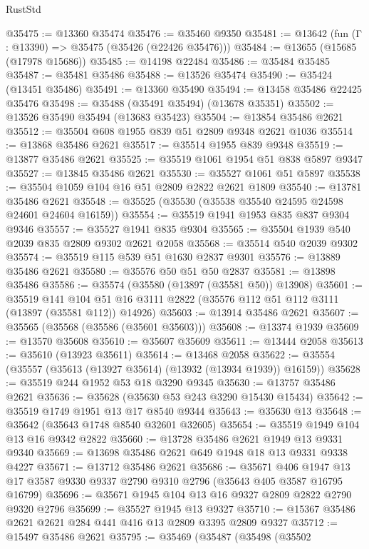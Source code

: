 \begin{lexlean}{RustStd}
\begin{coremodule}
@35475 := @13360 @35474
@35476 := @35460 @9350
@35481 := @13642 (fun (Γ : @13390) => @35475 (@35426 (@22426 @35476)))
@35484 := @13655 (@15685 (@17978 @15686))
@35485 := @14198 @22484
@35486 := @35484 @35485
@35487 := @35481 @35486
@35488 := @13526 @35474
@35490 := @35424 (@13451 @35486)
@35491 := @13360 @35490
@35494 := @13458 @35486 @22425 @35476
@35498 := @35488 (@35491 @35494) (@13678 @35351)
@35502 := @13526 @35490 @35494 (@13683 @35423)
@35504 := @13854 @35486 @2621
@35512 := @35504 @608 @1955 @839 @51 @2809 @9348 @2621 @1036
@35514 := @13868 @35486 @2621
@35517 := @35514 @1955 @839 @9348
@35519 := @13877 @35486 @2621
@35525 := @35519 @1061 @1954 @51 @838 @5897 @9347
@35527 := @13845 @35486 @2621
@35530 := @35527 @1061 @51 @5897
@35538 := @35504 @1059 @104 @16 @51 @2809 @2822 @2621 @1809
@35540 := @13781 @35486 @2621
@35548 := @35525 (@35530 (@35538 @35540 @24595 @24598 @24601 @24604 @16159))
@35554 := @35519 @1941 @1953 @835 @837 @9304 @9346
@35557 := @35527 @1941 @835 @9304
@35565 := @35504 @1939 @540 @2039 @835 @2809 @9302 @2621 @2058
@35568 := @35514 @540 @2039 @9302
@35574 := @35519 @115 @539 @51 @1630 @2837 @9301
@35576 := @13889 @35486 @2621
@35580 := @35576 @50 @51 @50 @2837
@35581 := @13898 @35486
@35586 := @35574 (@35580 (@13897 (@35581 @50)) @13908)
@35601 := @35519
    @141
    @104
    @51
    @16
    @3111
    @2822
    (@35576 @112 @51 @112 @3111 (@13897 (@35581 @112)) @14926)
@35603 := @13914 @35486 @2621
@35607 := @35565 (@35568 (@35586 (@35601 @35603)))
@35608 := @13374 @1939
@35609 := @13570 @35608
@35610 := @35607 @35609
@35611 := @13444 @2058
@35613 := @35610 (@13923 @35611)
@35614 := @13468 @2058
@35622 := @35554 (@35557 (@35613 (@13927 @35614) (@13932 (@13934 @1939)) @16159))
@35628 := @35519 @244 @1952 @53 @18 @3290 @9345
@35630 := @13757 @35486 @2621
@35636 := @35628 (@35630 @53 @243 @3290 @15430 @15434)
@35642 := @35519 @1749 @1951 @13 @17 @8540 @9344
@35643 := @35630 @13
@35648 := @35642 (@35643 @1748 @8540 @32601 @32605)
@35654 := @35519 @1949 @104 @13 @16 @9342 @2822
@35660 := @13728 @35486 @2621 @1949 @13 @9331 @9340
@35669 := @13698 @35486 @2621 @649 @1948 @18 @13 @9331 @9338 @4227
@35671 := @13712 @35486 @2621
@35686 := @35671
    @406
    @1947
    @13
    @17
    @3587
    @9330
    @9337
    @2790
    @9310
    @2796
    (@35643 @405 @3587 @16795 @16799)
@35696 := @35671 @1945 @104 @13 @16 @9327 @2809 @2822 @2790 @9320 @2796
@35699 := @35527 @1945 @13 @9327
@35710 := @15367 @35486 @2621 @2621 @284 @441 @416 @13 @2809 @3395 @2809 @9327
@35712 := @15497 @35486 @2621
@35795 := @35469
    (@35487
      (@35498
        (@35502

\end{coremodule}
\end{lexlean}
